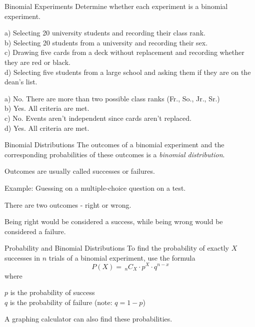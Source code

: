 \documentclass[t, aspectratio=169]{beamer}
\newcommand{\?}{\stackrel{?}{=}}
\newcommand{\nCr}[2]{\,_{#1}C_{#2}} %
\begin{document}
	\begin{frame}{Binomial Experiments}
		Determine whether each experiment is a binomial experiment.
		
		a) Selecting 20 university students and recording their class rank. \\
		b) Selecting 20 students from a university and recording their sex. \\
		c) Drawing five cards from a deck without replacement and recording whether they are red or black. \\
		d) Selecting five students from a large school and asking them if they are on the dean's list. \pause
		
		a) No. There are more than two possible class ranks (Fr., So., Jr., Sr.) \pause \\
		b) Yes. All criteria are met. \pause \\
		c) No. Events aren't independent since cards aren't replaced. \pause \\
		d) Yes. All criteria are met.
	\end{frame}

	\begin{frame}{Binomial Distributions}
		The outcomes of a binomial experiment and the corresponding probabilities of these outcomes is a \textit{binomial distribution}. \pause
		
		Outcomes are usually called successes or failures. \pause
		
		Example: Guessing on a multiple-choice question on a test. \pause
		
		There are two outcomes - right or wrong. \pause
		
		Being right would be considered a success, while being wrong would be considered a failure.
	\end{frame}

	\begin{frame}{Probability and Binomial Distributions}
		To find the probability of exactly $X$ successes in $n$ trials of a binomial experiment, use the formula $$P(X) = \nCr{n}{X}  \cdot p^X \cdot q^{n-x}$$ where
		
		$p$ is the probability of success \\
		$q$ is the probability of failure \pause (note: $q = 1 - p$) \pause
		
		A graphing calculator can also find these probabilities.
	\end{frame}
\end{document}
